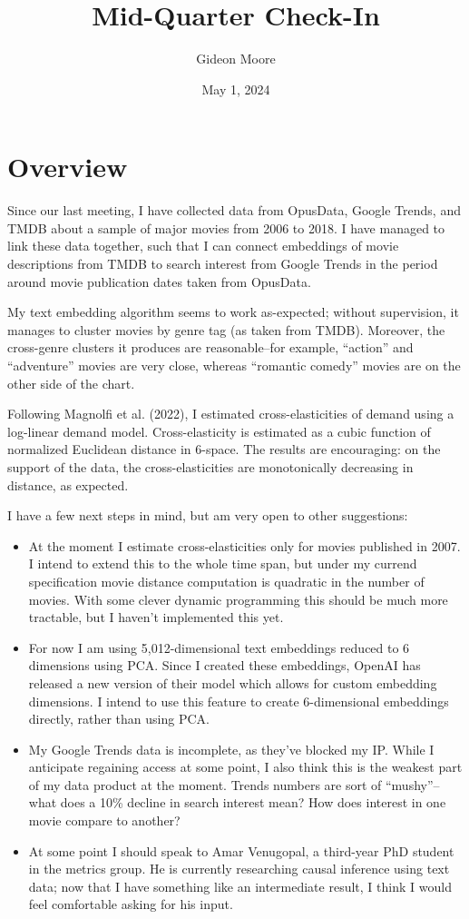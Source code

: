 \documentclass{article}
\author{Gideon Moore}
\title{Mid-Quarter Check-In}
\date{May 1, 2024}
\begin{document}
\maketitle

\section{Overview}

Since our last meeting, I have collected data from OpusData, Google Trends, and TMDB about a sample of major movies from 2006 to 2018. I have managed to link these data together, such that I can connect embeddings of movie descriptions from TMDB to search interest from Google Trends in the period around movie publication dates taken from OpusData. 

My text embedding algorithm seems to work as-expected; without supervision, it manages to cluster movies by genre tag (as taken from TMDB). Moreover, the cross-genre clusters it produces are reasonable--for example, ``action'' and ``adventure'' movies are very close, whereas ``romantic comedy'' movies are on the other side of the chart. 

Following Magnolfi et al. (2022), I estimated cross-elasticities of demand using a log-linear demand model. Cross-elasticity is estimated as a cubic function of normalized Euclidean distance in 6-space. The results are encouraging: on the support of the data, the cross-elasticities are monotonically decreasing in distance, as expected.

I have a few next steps in mind, but am very open to other suggestions:
\begin{itemize}
    \item At the moment I estimate cross-elasticities only for movies published in 2007. I intend to extend this to the whole time span, but under my currend specification movie distance computation is quadratic in the number of movies. With some clever dynamic programming this should be much more tractable, but I haven't implemented this yet.
    \item For now I am using 5,012-dimensional text embeddings reduced to 6 dimensions using PCA. Since I created these embeddings, OpenAI has released a new version of their model which allows for custom embedding dimensions. I intend to use this feature to create 6-dimensional embeddings directly, rather than using PCA.
    \item My Google Trends data is incomplete, as they've blocked my IP. While I anticipate regaining access at some point, I also think this is the weakest part of my data product at the moment. Trends numbers are sort of ``mushy''--what does a 10\% decline in search interest mean? How does interest in one movie compare to another?
    \item At some point I should speak to Amar Venugopal, a third-year PhD student in the metrics group. He is currently researching causal inference using text data; now that I have something like an intermediate result, I think I would feel comfortable asking for his input. 
\end{itemize}
\end{document}
